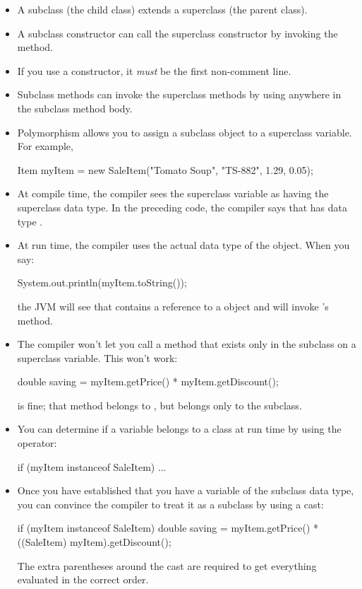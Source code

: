 \begin{itemize}
\item A subclass (the child class) extends a superclass (the parent class).
\item A subclass constructor can call the superclass constructor by invoking the  method.
\item If you use a  constructor, it {\em must} be the first non-comment line.
\item Subclass methods can invoke the superclass methods by using  anywhere in the subclass method body.
\item Polymorphism allows you to assign a subclass object to a superclass variable. For example,

\begin{code}
Item myItem = new SaleItem("Tomato Soup", "TS-882",
   1.29, 0.05);
\end{code}

\item At compile time, the compiler sees the superclass variable as having the superclass data type. In the preceding code, the compiler says that  has data type .

\item At run time, the compiler uses the actual data type of the object. When you say:

\begin{code}
System.out.println(myItem.toString());
\end{code}
    
the JVM will see that  contains a reference to a  object and will invoke 's  method.
\item The compiler won't let you call a method that exists only in the subclass on a superclass variable. This won't work:

\begin{code}
double saving = myItem.getPrice() * myItem.getDiscount();
\end{code}
    
 is fine; that method belongs to , but  belongs only to the subclass.
\item You can determine if a variable belongs to a class at run time by using the  operator:

\begin{code}
if (myItem instanceof SaleItem) {
    ...
}
\end{code}
    
\item Once you have established that you have a variable of the subclass data type, you can convince the compiler to treat it as a subclass by using a cast:

\begin{code}
if (myItem instanceof SaleItem) {
    double saving = myItem.getPrice() *
        ((SaleItem) myItem).getDiscount();
}
\end{code}
    
The extra parentheses around the cast are required to get everything evaluated in the correct order.
\end{itemize}

